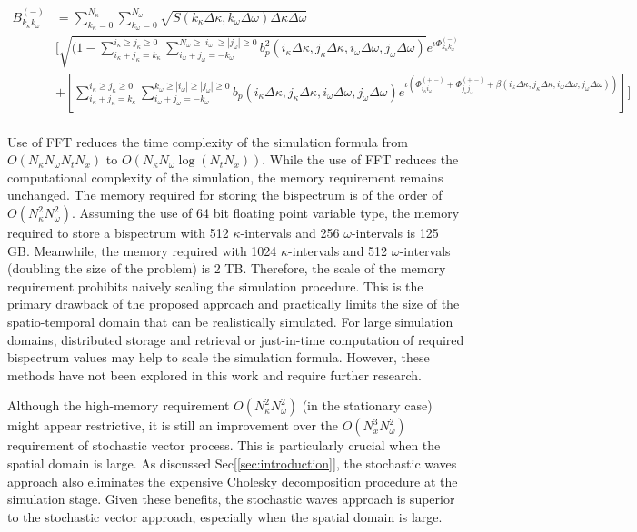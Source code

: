 \documentclass[preprint, review, 12pt]{elsarticle}
\begin{document}
\begin{equation}
\begin{aligned}
	B^{(-)}_{k_\kappa k_\omega } &= \sum_{k_\kappa=0}^{N_\kappa}\sum_{k_\omega=0}^{N_\omega} \sqrt{S(k_\kappa \Delta \kappa, k_\omega \Delta \omega) \Delta\kappa \Delta\omega}\\
    & \Big[ \sqrt{(1 - \sum_{i_\kappa + j_\kappa = k_\kappa }^{i_\kappa \geq j_\kappa \geq 0}\sum_{i_\omega + j_\omega = -k_\omega }^{N_\omega \geq |i_\omega| \geq |j_\omega| \geq 0}b_{p}^{2}(i_\kappa \Delta \kappa, j_\kappa \Delta \kappa, i_\omega \Delta \omega, j_\omega \Delta \omega)} e^{\iota\Phi_{k_\kappa k_\omega}^{(-)}}\\
    & + [\sum_{i_\kappa + j_\kappa = k_\kappa}^{i_\kappa \geq j_\kappa \geq 0}\sum_{i_\omega + j_\omega = -k_\omega}^{k_{\omega} \geq |i_{\omega}| \geq |j_{\omega}| \geq 0} b_{p}(i_\kappa \Delta \kappa, j_\kappa \Delta \kappa, i_{\omega} \Delta \omega, j_{\omega} \Delta \omega) e^{\iota(\Phi_{i_\kappa i_{\omega}}^{(+|-)} + \Phi_{j_\kappa j_{\omega}}^{(+|-)} +\beta(i_\kappa \Delta \kappa, j_\kappa \Delta \kappa, i_{\omega} \Delta \omega, j_{\omega} \Delta \omega))}] \Big]\\
\end{aligned}
\end{equation}

Use of FFT reduces the time complexity  of the simulation formula from $O(N_\kappa N_\omega N_t N_x)$ to $O(N_\kappa N_\omega \log (N_t N_x))$. While the use of FFT reduces the computational complexity of the simulation, the memory requirement remains unchanged. The memory required for storing the bispectrum is of the order of $O(N_{\kappa}^{2}N_{\omega}^{2})$. Assuming the use of 64 bit floating point variable type, the memory required to store a bispectrum with 512 $\kappa$-intervals and 256 $\omega$-intervals is 125 GB. Meanwhile, the memory required with 1024 $\kappa$-intervals and 512 $\omega$-intervals (doubling the size of the problem) is 2 TB. Therefore, the scale of the memory requirement prohibits naively scaling the simulation procedure. This is the primary drawback of the proposed approach and practically limits the size of the spatio-temporal domain that can be realistically simulated. For large simulation domains, distributed storage and retrieval or just-in-time computation of required bispectrum values may help to scale the simulation formula. However, these methods have not been explored in this work and require further research.

Although the high-memory requirement $O(N_{\kappa}^{2}N_{\omega}^{2})$ (in the stationary case) might appear restrictive, it is still an improvement over the $O(N_{x}^{3}N_{\omega}^{2})$ requirement of stochastic vector process. This is particularly crucial when the spatial domain is large. As discussed Sec[\ref{sec:introduction}], the stochastic waves approach also eliminates the expensive Cholesky decomposition procedure at the simulation stage. Given these benefits, the stochastic waves approach is superior to the stochastic vector approach, especially when the spatial domain is large.
\end{document}
